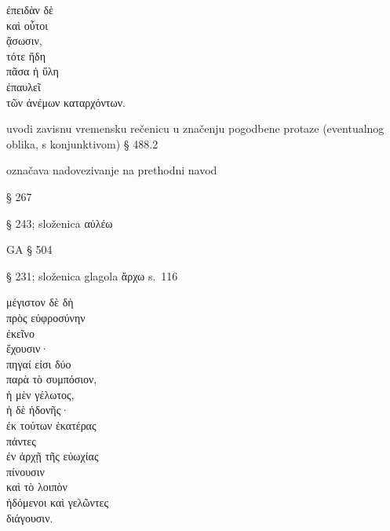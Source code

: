 

{\large
\begin{greek}
\noindent ἐπειδὰν δὲ \\
καὶ οὗτοι \\
ᾄσωσιν, \\
τότε ἤδη \\
πᾶσα ἡ ὕλη\\
ἐπαυλεῖ \\
\tabto{2em} τῶν ἀνέμων καταρχόντων. \\

\end{greek}
}

\begin{description}[noitemsep]
\item[ἐπειδὰν] uvodi zavisnu vremensku rečenicu u značenju pogodbene protaze (eventualnog oblika, s konjunktivom) § 488.2
\item[δὲ] označava nadovezivanje na prethodni navod
\item[ᾄσωσιν] § 267
\item[ἐπαυλεῖ] § 243; složenica αὐλέω
\item[τῶν ἀνέμων καταρχόντων] GA § 504
\item[καταρχόντων] § 231; složenica glagola ἄρχω s.~116
\end{description}



{\large
\begin{greek}
\noindent μέγιστον δὲ δὴ \\
\tabto{2em} πρὸς εὐφροσύνην \\
ἐκεῖνο \\
ἔχουσιν· \\
πηγαί εἰσι δύο \\
\tabto{2em} παρὰ τὸ συμπόσιον, \\
ἡ μὲν γέλωτος, \\
ἡ δὲ ἡδονῆς· \\
\tabto{2em} ἐκ τούτων ἑκατέρας\\
πάντες \\
\tabto{2em} ἐν ἀρχῇ τῆς εὐωχίας \\
πίνουσιν \\
καὶ τὸ λοιπὸν \\
ἡδόμενοι καὶ γελῶντες \\
διάγουσιν.\\

\end{greek}
}

